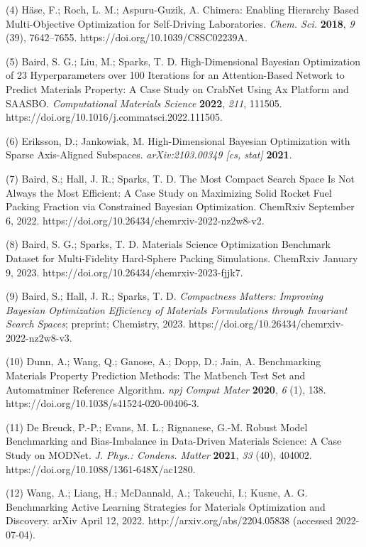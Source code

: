 (4) Häse, F.; Roch, L. M.; Aspuru-Guzik, A. Chimera: Enabling Hierarchy
Based Multi-Objective Optimization for Self-Driving Laboratories.
\emph{Chem. Sci.} \textbf{2018}, \emph{9} (39), 7642--7655.
https://doi.org/10.1039/C8SC02239A.

(5) Baird, S. G.; Liu, M.; Sparks, T. D. High-Dimensional Bayesian
Optimization of 23 Hyperparameters over 100 Iterations for an
Attention-Based Network to Predict Materials Property: A Case Study on
CrabNet Using Ax Platform and SAASBO. \emph{Computational Materials
Science} \textbf{2022}, \emph{211}, 111505.
https://doi.org/10.1016/j.commatsci.2022.111505.

(6) Eriksson, D.; Jankowiak, M. High-Dimensional Bayesian Optimization
with Sparse Axis-Aligned Subspaces. \emph{arXiv:2103.00349 {[}cs,
stat{]}} \textbf{2021}.

(7) Baird, S.; Hall, J. R.; Sparks, T. D. The Most Compact Search Space
Is Not Always the Most Efficient: A Case Study on Maximizing Solid
Rocket Fuel Packing Fraction via Constrained Bayesian Optimization.
ChemRxiv September 6, 2022.
https://doi.org/10.26434/chemrxiv-2022-nz2w8-v2.

(8) Baird, S. G.; Sparks, T. D. Materials Science Optimization Benchmark
Dataset for Multi-Fidelity Hard-Sphere Packing Simulations. ChemRxiv
January 9, 2023. https://doi.org/10.26434/chemrxiv-2023-fjjk7.

(9) Baird, S.; Hall, J. R.; Sparks, T. D. \emph{Compactness Matters:
Improving Bayesian Optimization Efficiency of Materials Formulations
through Invariant Search Spaces}; preprint; Chemistry, 2023.
https://doi.org/10.26434/chemrxiv-2022-nz2w8-v3.

(10) Dunn, A.; Wang, Q.; Ganose, A.; Dopp, D.; Jain, A. Benchmarking
Materials Property Prediction Methods: The Matbench Test Set and
Automatminer Reference Algorithm. \emph{npj Comput Mater} \textbf{2020},
\emph{6} (1), 138. https://doi.org/10.1038/s41524-020-00406-3.

(11) De Breuck, P.-P.; Evans, M. L.; Rignanese, G.-M. Robust Model
Benchmarking and Bias-Imbalance in Data-Driven Materials Science: A Case
Study on MODNet. \emph{J. Phys.: Condens. Matter} \textbf{2021},
\emph{33} (40), 404002. https://doi.org/10.1088/1361-648X/ac1280.

(12) Wang, A.; Liang, H.; McDannald, A.; Takeuchi, I.; Kusne, A. G.
Benchmarking Active Learning Strategies for Materials Optimization and
Discovery. arXiv April 12, 2022. http://arxiv.org/abs/2204.05838
(accessed 2022-07-04).

